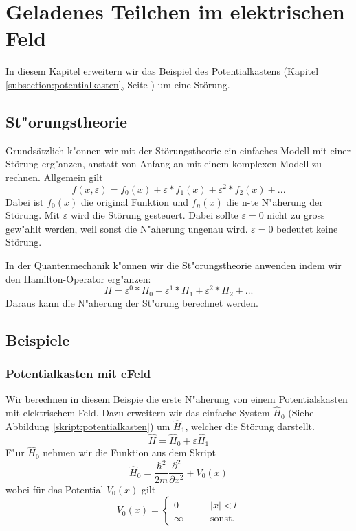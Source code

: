 \chapter{Geladenes Teilchen im elektrischen Feld\label{chapter:efeld}}
\begin{refsection}


In diesem Kapitel erweitern wir das Beispiel des Potentialkastens 
(Kapitel \ref{subsection:potentialkasten}, Seite \pageref{subsection:potentialkasten})
um eine St\"orung.

\section{ St"orungstheorie }
Grundsätzlich k"onnen wir mit der St\"orungstheorie ein einfaches Modell mit einer St\"orung erg"anzen, anstatt von Anfang an mit einem komplexen Modell zu rechnen.
Allgemein gilt
\[
f(x, \varepsilon) = f_0(x) + \varepsilon*f_1(x) + \varepsilon^2*f_2(x) + ...
\]
Dabei ist $f_0(x)$ die original Funktion und $f_n(x)$ die n-te  N"aherung der Störung.
Mit $\varepsilon$ wird die Störung gesteuert. Dabei sollte $\varepsilon = 0$ nicht zu gross gew"ahlt werden, weil sonst die N"aherung ungenau wird. $\varepsilon = 0$ bedeutet keine Störung.

In der Quantenmechanik k"onnen wir die St"orungstheorie anwenden indem wir den Hamilton-Operator erg"anzen:
\[
H = \varepsilon^0*H_0 + \varepsilon^1*H_1 + \varepsilon^2*H_2 + ...
\]
Daraus kann die N"aherung der St"orung berechnet werden.






\section{ Beispiele }

\subsection{ Potentialkasten mit eFeld }

Wir berechnen in diesem Beispie die erste N"aherung von einem Potentialskasten mit elektrischem Feld.
Dazu erweitern wir das einfache System  $\hat H_0$
(Siehe Abbildung \ref{skript:potentialkasten})
um $\hat H_1$, welcher die Störung darstellt.
\[
\hat{H} = \hat H_0 + \varepsilon \hat H_1
\]
F"ur $\hat H_0$ nehmen wir die Funktion aus dem Skript
\[
  \hat H_0 = \frac{\hbar^2}{2m} \frac{\partial^2}{\partial x^2} + V_0(x)
\]
wobei f\"ur das Potential $V_0(x)$ gilt
\[
  V_0(x)=\begin{cases}
    0       & \qquad |x|<l\\
    \infty  & \qquad\text{sonst.}
  \end{cases}
\]


\end{refsection}
